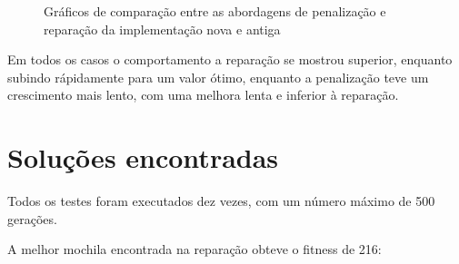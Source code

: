 \documentclass[11pt]{article}
\begin{document}
\begin{figure}[h]
	\centering
	\quad %
	\caption{Gráficos de comparação entre as abordagens de penalização e reparação da implementação nova e antiga}
	\label{fig:comparacao}
\end{figure}



Em todos os casos o comportamento a reparação se mostrou superior, enquanto subindo rápidamente para um valor ótimo, enquanto a penalização teve um crescimento mais lento, com uma melhora lenta e inferior à reparação.


\section{Soluções encontradas}

Todos os testes foram executados dez vezes, com um número máximo de 500 gerações.

A melhor mochila encontrada na reparação obteve o fitness de 216:
\end{document}
